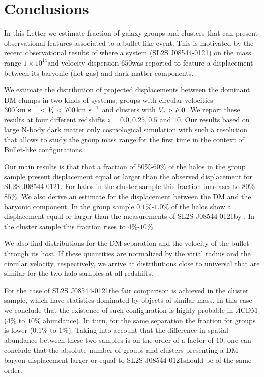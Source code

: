 \documentclass{emulateapj}
\newcommand{\hMsun}{{\ifmmode{h^{-1}{\rm {M_{\odot}}}}\else{$h^{-1}{\rm{M_{\odot}}}$}\fi}}
\newcommand{\kms}{{\ifmmode{{\mathrm{\,km\ s}^{-1}}}\else{\,km~s$^{-1}$}\fi}}
\newcommand{\bullg}{SL2S J08544-0121}
\begin{document}
\section{Conclusions}
\label{sec:conclusions}

In this Letter we estimate fraction of galaxy groups and clusters that
can present observational features associated to a bullet-like
event. This is motivated by the recent observational results of
\citep{Gastaldello} where a system (\bullg) on the mass range $1\times
10^{14}$\hMsun and velocity dispersion $650$\kms was reported to
feature a displacement between its baryonic (hot gas) and dark matter
components.  


We estimate the distribution of projected displacements
between the dominant DM clumps in two kinds of systems; groups with
circular velocities $300\kms<V_{\rm c}<700\kms$ and clusters with $V_{\rm
  c}>700$\kms. We report these results at four different redshifts
$z=0.0,0.25,0.5$ and $10$. Our results based on large N-body dark
matter only cosmological simulation with such a resolution that allows
to study the group mass range for the first time in the context of
Bullet-like configurations. 


Our main results is that that a fraction of $50\%$-$60\%$ of the halos
in the group sample present displacement equal or larger than the
observed displacement for \bullg. For halos in the cluster sample this
fraction increases to $80\%$-$85\%$. We also derive an
estimate for the displacement between the DM and the baryonic
component. In the group sample $0.1\%$-$1.0\%$ of the halos show a
displacement equal or larger than  the  measurements of \bullg by
\citep{Gastaldello}. In the cluster sample this fraction rises to
$4\%$-$10\%$. 

We also find distributions for the DM separation and the velocity of
the bullet through its host. If these quantities are normalized by the
virial radius and the circular velocity, respectively, we arrive at
distributions close to universal that are similar for the two halo
samples at all redshifts.

For the case of \bullg the fair comparison is achieved in the cluster
sample, which have statistics dominated by objects of similar mass. In
this case we conclude that the existence of such configuration is
highly probable in $\Lambda$CDM (4$\%$ to $10\%$ abundance). In turn,
for the same separation the fraction for groups is lower (0.1$\%$ to
$1\%$). Taking into account that the difference in spatial abundance between
these two samples is on the order of a factor of $10$, one can
conclude that the absolute number of groups and clusters presenting a DM-baryon
displacement larger or equal to \bullg should be of the same order.
\end{document}
